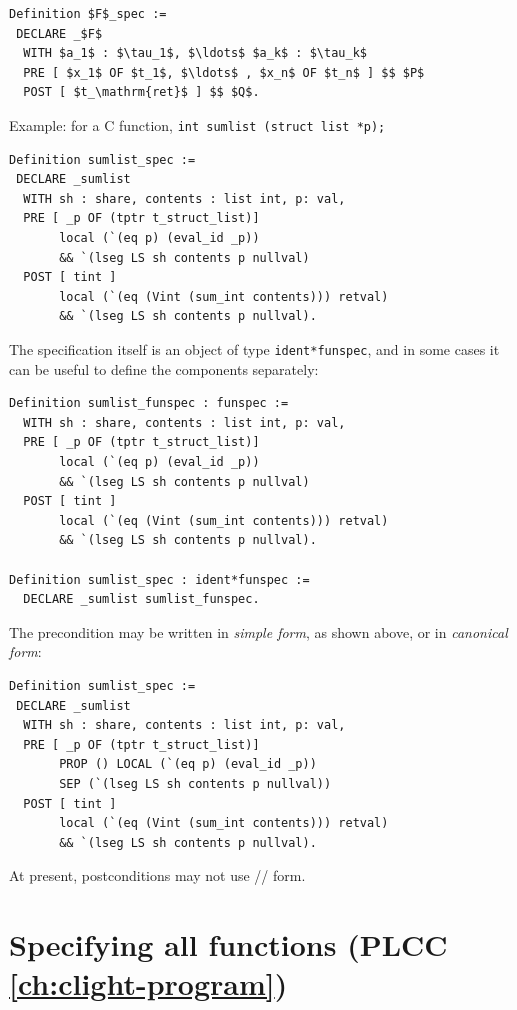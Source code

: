 \documentclass[12pt,fleqn,openany,oneside,showtrims]{memoir}
\newcommand{\ychapter}[2]{\chapter[#1]{#1 \hfill \normalsize #2}}
\begin{document}
\begin{lstlisting}
Definition $F$_spec :=
 DECLARE _$F$
  WITH $a_1$ : $\tau_1$, $\ldots$ $a_k$ : $\tau_k$
  PRE [ $x_1$ OF $t_1$, $\ldots$ , $x_n$ OF $t_n$ ] $$ $P$
  POST [ $t_\mathrm{ret}$ ] $$ $Q$.
\end{lstlisting}

Example: for a C function, \lstinline{int sumlist (struct list *p);}

\begin{lstlisting}
Definition sumlist_spec :=
 DECLARE _sumlist
  WITH sh : share, contents : list int, p: val,
  PRE [ _p OF (tptr t_struct_list)]
       local (`(eq p) (eval_id _p))
       && `(lseg LS sh contents p nullval)
  POST [ tint ]
       local (`(eq (Vint (sum_int contents))) retval)
       && `(lseg LS sh contents p nullval).
\end{lstlisting}

The specification itself is an object of type \lstinline{ident*funspec},
and in some cases it can be useful to define the components
separately:

\begin{lstlisting}
Definition sumlist_funspec : funspec :=
  WITH sh : share, contents : list int, p: val,
  PRE [ _p OF (tptr t_struct_list)]
       local (`(eq p) (eval_id _p))
       && `(lseg LS sh contents p nullval)
  POST [ tint ]
       local (`(eq (Vint (sum_int contents))) retval)
       && `(lseg LS sh contents p nullval).

Definition sumlist_spec : ident*funspec :=
  DECLARE _sumlist sumlist_funspec.
\end{lstlisting}

The precondition may be written in
\emph{simple form}, as shown above, or in \emph{canonical form}:

\begin{lstlisting}
Definition sumlist_spec :=
 DECLARE _sumlist
  WITH sh : share, contents : list int, p: val,
  PRE [ _p OF (tptr t_struct_list)]
       PROP () LOCAL (`(eq p) (eval_id _p))
       SEP (`(lseg LS sh contents p nullval))
  POST [ tint ]
       local (`(eq (Vint (sum_int contents))) retval)
       && `(lseg LS sh contents p nullval).
\end{lstlisting}

At present, postconditions may not use \PROP/\LOCAL/\SEP{} form.

\ychapter{Specifying all functions}{\hspace{-.4in}(PLCC \autoref{ch:clight-program})}
\end{document}
